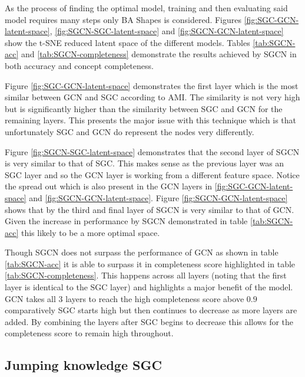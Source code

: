 As the process of finding the optimal model, training and then evaluating said model requires many steps only BA Shapes is considered.
Figures \ref{fig:SGC-GCN-latent-space}, \ref{fig:SGCN-SGC-latent-space} and \ref{fig:SGCN-GCN-latent-space} show the t-SNE reduced latent space of the different models.
Tables \ref{tab:SGCN-acc} and \ref{tab:SGCN-completeness} demonstrate the results achieved by SGCN in both accuracy and concept completeness.

Figure \ref{fig:SGC-GCN-latent-space} demonstrates the first layer which is the most similar between GCN and SGC according to AMI.
The similarity is not very high but is significantly higher than the similarity between SGC and GCN for the remaining layers.
This presents the major issue with this technique which is that unfortunately SGC and GCN do represent the nodes very differently.

Figure \ref{fig:SGCN-SGC-latent-space} demonstrates that the second layer of SGCN is very similar to that of SGC.
This makes sense as the previous layer was an SGC layer and so the GCN layer is working from a different feature space.
Notice the spread out  which is also present in the GCN layers in \ref{fig:SGC-GCN-latent-space} and \ref{fig:SGCN-GCN-latent-space}.
Figure \ref{fig:SGCN-GCN-latent-space} shows that by the third and final layer of SGCN is very similar to that of GCN.
Given the increase in performance by SGCN demonstrated in table \ref{tab:SGCN-acc} this likely to be a more optimal space.

Though SGCN does not surpass the performance of GCN as shown in table \ref{tab:SGCN-acc} it is able to surpass it in completeness score highlighted in table \ref{tab:SGCN-completeness}.
This happens across all layers (noting that the first layer is identical to the SGC layer) and highlights a major benefit of the model.
GCN takes all 3 layers to reach the high completeness score above $0.9$ comparatively SGC starts high but then continues to decrease as more layers are added.
By combining the layers after SGC begins to decrease this allows for the completeness score to remain high throughout.

\subsection{Jumping knowledge SGC}
\label{sec:Jump-SGC}





